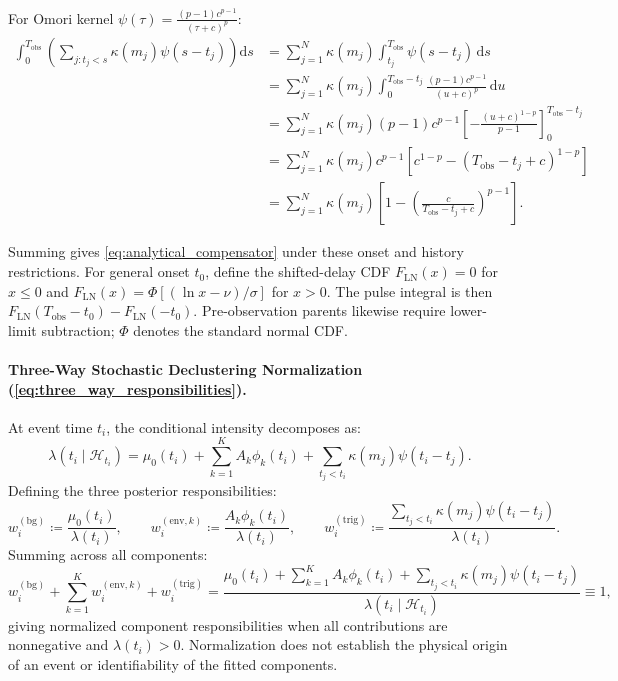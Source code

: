 \begin{enumerate}
    For Omori kernel $\psi(\tau)
    = \frac{(p - 1)c^{p-1}}{(\tau + c)^p}$:
    \begin{equation}
      \begin{aligned}
        \int_0^{T_{\mathrm{obs}}} \left(\sum_{j: t_j < s}
        \kappa(m_j)\psi(s - t_j)\right)\mathrm{d}s
        &= \sum_{j=1}^N \kappa(m_j) \int_{t_j}^{T_{\mathrm{obs}}}
        \psi(s - t_j)\,\mathrm{d}s \\
        &= \sum_{j=1}^N \kappa(m_j) \int_0^{T_{\mathrm{obs}} - t_j}
        \frac{(p - 1)c^{p-1}}{(u + c)^p}\,\mathrm{d}u \\
        &= \sum_{j=1}^N \kappa(m_j) (p - 1)c^{p-1} \left[ -\frac{(u
        + c)^{1-p}}{p - 1} \right]_0^{T_{\mathrm{obs}} - t_j} \\
        &= \sum_{j=1}^N \kappa(m_j) c^{p-1} \left[ c^{1-p} -
        (T_{\mathrm{obs}} - t_j + c)^{1-p} \right] \\
        &= \sum_{j=1}^N \kappa(m_j) \left[ 1 - \left(
        \frac{c}{T_{\mathrm{obs}} - t_j + c} \right)^{\!p-1} \right].
      \end{aligned}
    \end{equation}
\end{enumerate}
Summing gives \cref{eq:analytical_compensator} under these onset and
history restrictions. For general onset $t_0$, define the shifted-delay
CDF $F_{\mathrm{LN}}(x)=0$ for $x\le0$ and
$F_{\mathrm{LN}}(x)=\Phi[(\ln x-\nu)/\sigma]$ for $x>0$.
The pulse integral is then $F_{\mathrm{LN}}(T_{\mathrm{obs}}-t_0)
-F_{\mathrm{LN}}(-t_0)$. Pre-observation parents likewise require
lower-limit subtraction; $\Phi$ denotes the standard normal CDF.

\paragraph{Three-Way Stochastic Declustering Normalization
(\cref{eq:three_way_responsibilities}).}
At event time $t_i$, the conditional intensity decomposes as:
\begin{equation}
  \lambda(t_i \mid \mathcal{H}_{t_i}) = \mu_0(t_i) + \sum_{k=1}^K
  A_k \phi_k(t_i) + \sum_{t_j < t_i} \kappa(m_j)\psi(t_i - t_j).
\end{equation}
Defining the three posterior responsibilities:
\begin{equation}
  w_i^{(\mathrm{bg})} \coloneqq \frac{\mu_0(t_i)}{\lambda(t_i)}, \qquad
  w_i^{(\mathrm{env}, k)} \coloneqq \frac{A_k
  \phi_k(t_i)}{\lambda(t_i)}, \qquad
  w_i^{(\mathrm{trig})} \coloneqq \frac{\sum_{t_j <
  t_i}\kappa(m_j)\psi(t_i - t_j)}{\lambda(t_i)}.
\end{equation}
Summing across all components:
\begin{equation}
  w_i^{(\mathrm{bg})} + \sum_{k=1}^K w_i^{(\mathrm{env}, k)} +
  w_i^{(\mathrm{trig})}
  = \frac{\mu_0(t_i) + \sum_{k=1}^K A_k \phi_k(t_i) + \sum_{t_j <
  t_i}\kappa(m_j)\psi(t_i - t_j)}{\lambda(t_i \mid
  \mathcal{H}_{t_i})} \equiv 1,
\end{equation}
giving normalized component responsibilities when all contributions are
nonnegative and $\lambda(t_i)>0$. Normalization does not establish the
physical origin of an event or identifiability of the fitted components.

